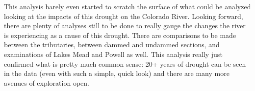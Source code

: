 \documentclass[
  12pt,
]{article}
\begin{document}
This analysis barely even started to scratch the surface of what could
be analyzed looking at the impacts of this drought on the Colorado
River. Looking forward, there are plenty of analyses still to be done to
really gauge the changes the river is experiencing as a cause of this
drought. There are comparisons to be made between the tributaries,
between dammed and undammed sections, and examinations of Lakes Mead and
Powell as well. This analysis really just confirmed what is pretty much
common sense: 20+ years of drought can be seen in the data (even with
such a simple, quick look) and there are many more avenues of
exploration open.
\end{document}

